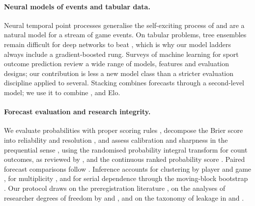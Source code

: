 \paragraph{Neural models of events and tabular data.}
Neural temporal point processes \citep{mei2017neural,zuo2020transformer}
generalise the self-exciting process of \citet{hawkes1971spectra} and are a
natural model for a stream of game events. On tabular problems, tree ensembles
\citep{friedman2001greedy,chen2016xgboost,ke2017lightgbm} remain difficult for deep networks
to beat \citep{grinsztajn2022tree,shwartzziv2022tabular}, which is why our
model ladders always include a gradient-boosted rung. Surveys of machine
learning for sport outcome prediction \citep{bunker2019machine,horvat2020use}
review a wide range of models, features and evaluation designs; our
contribution is less a new model class than a stricter evaluation discipline
applied to several.
Stacking \citep{wolpert1992stacked,breiman1996stacked} combines forecasts
through a second-level model; we use it to combine \neurhlG{}, \neurhlH{} and Elo.

\paragraph{Forecast evaluation and research integrity.}
We evaluate probabilities with proper scoring rules
\citep{brier1950verification,gneiting2007strictly}, decompose the Brier
score into reliability and resolution \citep{murphy1973new}, and assess
calibration and sharpness in the prequential sense
\citep{dawid1984present,gneiting2007probabilistic}, using the randomised
probability integral transform for count outcomes, as reviewed by
\citet{czado2009predictive}, and the continuous ranked probability score
\citep{matheson1976scoring}. Paired forecast
comparisons follow \citet{diebold1995comparing}. Inference accounts for
clustering by player and game \citep{cameron2011robust}, for multiplicity
\citep{holm1979simple}, and for serial dependence through the moving-block
bootstrap \citep{kunsch1989jackknife}. Our protocol draws on the
preregistration literature \citep{nosek2018preregistration}, on the analyses of
researcher degrees of freedom by \citet{simmons2011false} and
\citet{gelman2014statistical}, and on the taxonomy of leakage in
\citet{kaufman2012leakage} and \citet{kapoor2023leakage}.
